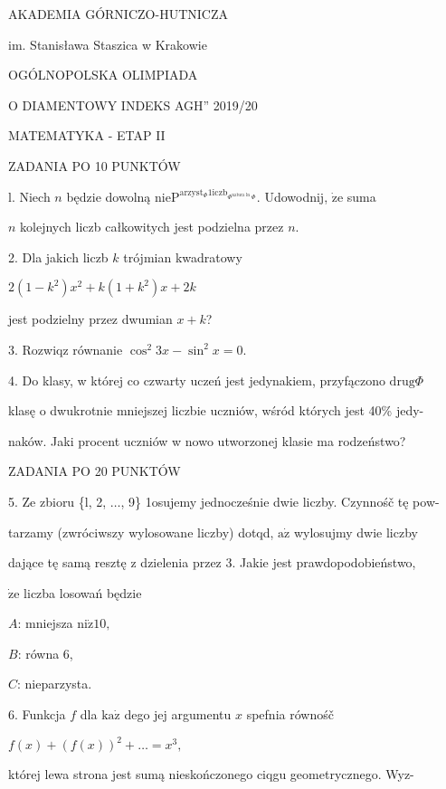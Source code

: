 \documentclass[a4paper,12pt]{article}
\begin{document}
AKADEMIA GÓRNICZO-HUTNICZA

im. Stanisława Staszica w Krakowie

OGÓLNOPOLSKA OLIMPIADA

O DIAMENTOWY INDEKS AGH'' 2019/20

MATEMATYKA - ETAP II

ZADANIA PO 10 PUNKTÓW

l. Niech $n$ będzie dowolną $\mathrm{n}\mathrm{i}\mathrm{e}\mathrm{P}^{\mathrm{a}\mathrm{r}\mathrm{z}\mathrm{y}\mathrm{s}\mathrm{t}_{\Phi}1\mathrm{i}\mathrm{c}\mathrm{z}\mathrm{b}_{\Phi^{\mathrm{n}\mathrm{a}\mathrm{t}\mathrm{u}\mathrm{r}\mathrm{a}\ln}\Phi}}$. Udowodnij, $\dot{\mathrm{z}}\mathrm{e}$ suma

$n$ kolejnych liczb całkowitych jest podzielna przez $n.$

2. Dla jakich liczb $k$ trójmian kwadratowy

$2(1-k^{2})x^{2}+k(1+k^{2})x+2k$

jest podzielny przez dwumian $x+k$?

3. Rozwiqz równanie $\cos^{2}3x-\sin^{2}x=0.$

4. Do klasy, w której co czwarty uczeń jest jedynakiem, przyfączono $\mathrm{d}\mathrm{r}\mathrm{u}\mathrm{g}\Phi$

klasę o dwukrotnie mniejszej liczbie uczniów, wśród których jest 40\% jedy-

naków. Jaki procent uczniów w nowo utworzonej klasie ma rodzeństwo?

ZADANIA PO 20 PUNKTÓW

5. Ze zbioru \{l, 2, $\ldots$, 9\} 1osujemy jednocześnie dwie liczby. Czynnośč tę pow-

tarzamy (zwróciwszy wylosowane liczby) dotqd, $\mathrm{a}\dot{\mathrm{z}}$ wylosujmy dwie liczby

dające tę samą resztę z dzielenia przez 3. Jakie jest prawdopodobieństwo,

$\dot{\mathrm{z}}\mathrm{e}$ liczba losowań będzie

$A$: mniejsza $\mathrm{n}\mathrm{i}\dot{\mathrm{z}}10,$

$B$: równa 6,

$C$: nieparzysta.

6. Funkcja $f$ dla $\mathrm{k}\mathrm{a}\dot{\mathrm{z}}$ dego jej argumentu $x$ spefnia równośč

$f(x)+(f(x))^{2}+\ldots=x^{3},$

której lewa strona jest sumą nieskończonego ciqgu geometrycznego. Wyz-
\end{document}
